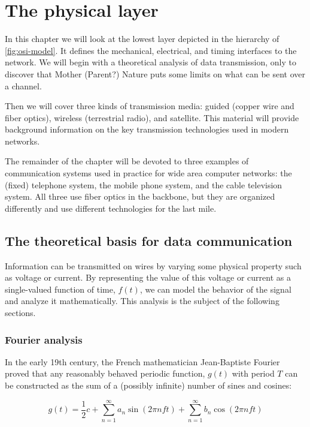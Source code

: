 \chapter{The physical layer}

In this chapter we will look at the lowest layer depicted in the hierarchy of \vref{fig:osi-model}.
It defines the mechanical, electrical, and timing interfaces to the network.
We will begin with a theoretical analysis of data transmission, only to discover that Mother (Parent?) Nature puts some limits on what can be sent over a channel.

Then we will cover three kinds of transmission media: guided (copper
wire and fiber optics), wireless (terrestrial radio), and satellite.
This material will provide background information on the key
transmission technologies used in modern networks.

The remainder of the chapter will be devoted to three examples of
communication systems used in practice for wide area computer networks:
the (fixed) telephone system, the mobile phone system, and the cable
television system. All three use fiber optics in the backbone, but they
are organized differently and use different technologies for the last
mile.

\section{The theoretical basis for data communication}

Information can be transmitted on wires by varying some physical property such as voltage or current.
By representing the value of this voltage or current as a single-valued function of time, $f(t)$, we can model the behavior of the signal and analyze it mathematically.
This analysis is the subject of the following sections.
\subsection{Fourier analysis}

In the early 19th century, the French mathematician Jean-Baptiste Fourier proved that any reasonably behaved periodic function, $g(t)$ with period $T$ can be constructed as the sum of a (possibly infinite) number of sines and cosines:

\begin{equation}
g(t) = \frac{1}{2}c + \sum_{n=1}^\infty a_n \sin(2\pi nft) + \sum_{n=1}^\infty b_n \cos(2\pi nft) \label{eqn:fourier}
\end{equation}

